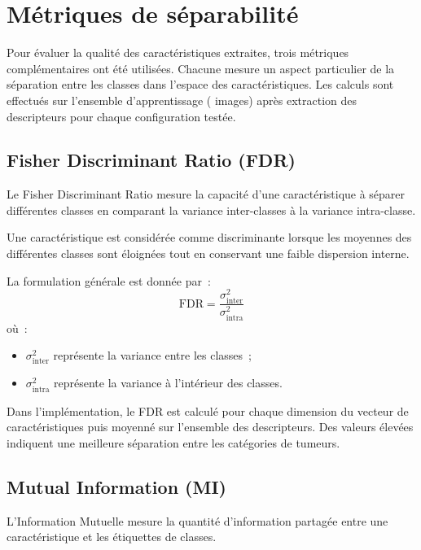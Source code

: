 \section{Métriques de séparabilité}

Pour évaluer la qualité des caractéristiques extraites, trois métriques complémentaires ont
été utilisées. Chacune mesure un aspect particulier de la séparation entre les classes dans
l'espace des caractéristiques. Les calculs sont effectués sur l'ensemble d'apprentissage
(\NTrain{} images) après extraction des descripteurs pour chaque configuration testée.

\subsection{Fisher Discriminant Ratio (FDR)}

Le Fisher Discriminant Ratio mesure la capacité d'une caractéristique à séparer différentes
classes en comparant la variance inter-classes à la variance intra-classe.

Une caractéristique est considérée comme discriminante lorsque les moyennes des différentes
classes sont éloignées tout en conservant une faible dispersion interne.

La formulation générale est donnée par~:
\begin{equation}
  \mathrm{FDR} = \frac{\sigma^2_{\mathrm{inter}}}{\sigma^2_{\mathrm{intra}}}
\end{equation}
où~:
\begin{itemize}[leftmargin=1.4em,itemsep=2pt]
  \item $\sigma^2_{\mathrm{inter}}$ représente la variance entre les classes~;
  \item $\sigma^2_{\mathrm{intra}}$ représente la variance à l'intérieur des classes.
\end{itemize}

Dans l'implémentation, le FDR est calculé pour chaque dimension du vecteur de
caractéristiques puis moyenné sur l'ensemble des descripteurs. Des valeurs élevées
indiquent une meilleure séparation entre les catégories de tumeurs.

\subsection{Mutual Information (MI)}

L'Information Mutuelle mesure la quantité d'information partagée entre une caractéristique et
les étiquettes de classes.

